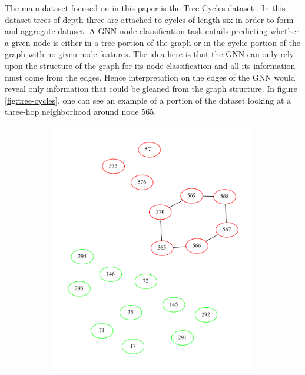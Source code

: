 The main dataset focused on in this paper is the Tree-Cycles dataset \cite{ying_gnnexplainer_2019}. In this dataset trees of depth three are attached to cycles of length six in order to form and aggregate dataset. A GNN node classification task entails predicting whether a given node is either in a tree portion of the graph or in the cyclic portion of the graph with no given node features. The idea here is that the GNN can only rely upon the structure of the graph for its node classification and all its information must come from the edges. Hence interpretation on the edges of the GNN would reveal only information that could be gleaned from the graph structure. In figure \ref{fig:tree-cycles}, one can see an example of a portion of the dataset looking at a three-hop neighborhood around node 565.
\begin{figure}[h]
	\centering
	\begin{subfigure}{0.49\textwidth}
		\centering
		\includegraphics[width=0.9\linewidth]{images/tree-cycles-pos.pdf}
	\end{subfigure}
	\begin{subfigure}{0.49\textwidth}
		\centering

\end{subfigure}
\end{figure}
